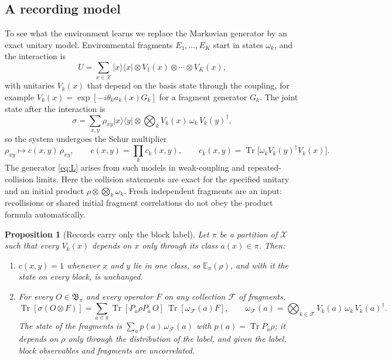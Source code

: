 \documentclass[12pt,a4paper]{article}
\newtheorem{proposition}[theorem]{Proposition}
\newcommand{\B}{\mathfrak B}
\newcommand{\E}{\mathbb E}
\newcommand{\ket}[1]{|#1\rangle}
\newcommand{\bra}[1]{\langle #1|}
\newcommand{\proj}[1]{|#1\rangle\!\langle #1|}
\newcommand{\Tr}{\operatorname{Tr}}
\begin{document}
\subsection{A recording model}

To see what the environment learns we replace the Markovian generator by an exact unitary model. Environmental fragments $E_1,\dots,E_K$ start in states $\omega_k$, and the interaction is
\begin{equation}
U=\sum_{x\in\mathcal X}\proj x\otimes V_1(x)\otimes\cdots\otimes V_K(x),
\label{eq:U}
\end{equation}
with unitaries $V_k(x)$ that depend on the basis state through the coupling, for example $V_k(x)=\exp[-i\theta_k a_k(x)G_k]$ for a fragment generator $G_k$. The joint state after the interaction is
\[
\sigma=\sum_{x,y}\rho_{xy}\ket x\!\bra y\otimes\bigotimes_kV_k(x)\,\omega_k\,V_k(y)^\dagger ,
\]
so the system undergoes the Schur multiplier
\begin{equation}
\rho_{xy}\mapsto c(x,y)\,\rho_{xy},\qquad c(x,y)=\prod_kc_k(x,y),\qquad c_k(x,y)=\Tr\bigl[\omega_kV_k(y)^\dagger V_k(x)\bigr].
\label{eq:coherence}
\end{equation}
The generator \eqref{eq:L} arises from such models in weak-coupling and repeated-collision limits. Here the collision statements are exact for the specified unitary and an initial product $\rho\otimes\bigotimes_k\omega_k$. Fresh independent fragments are an input: recollisions or shared initial fragment correlations do not obey the product formula automatically.

\begin{proposition}[Records carry only the block label]
\label{prop:centre}
Let $\pi$ be a partition of $\mathcal X$ such that every $V_k(x)$ depends on $x$ only through its class $a(x)\in\pi$. Then:
\begin{enumerate}
\item $c(x,y)=1$ whenever $x$ and $y$ lie in one class, so $\E_\pi(\rho)$, and with it the state on every block, is unchanged.
\item For every $O\in\B_\pi$ and every operator $F$ on any collection $\mathcal F$ of fragments,
\[
\Tr[\sigma(O\otimes F)]=\sum_{a\in\pi}\Tr[P_a\rho P_a\,O]\ \Tr[\omega_{\mathcal F}(a)F],\qquad
\omega_{\mathcal F}(a)=\bigotimes_{k\in\mathcal F}V_k(a)\,\omega_k\,V_k(a)^\dagger .
\]
The state of the fragments is $\sum_ap(a)\,\omega_{\mathcal F}(a)$ with $p(a)=\Tr P_a\rho$; it depends on $\rho$ only through the distribution of the label, and given the label, block observables and fragments are uncorrelated.
\end{enumerate}
\end{proposition}
\end{document}
